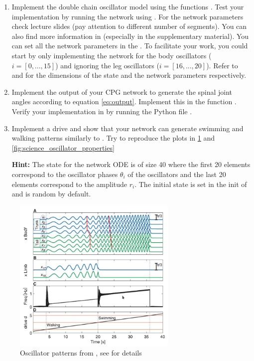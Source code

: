 \documentclass{cmc}
\begin{document}
\begin{enumerate}
\item Implement the double chain oscillator model using the functions
  . Test your implementation by running the
  network using . For the network parameters check
  lecture slides (pay attention to different number of segments). You can also
  find more information in \cite{ijspeert2007swimming} (especially in the
  supplementary material). You can set all the network parameters in the
  . To facilitate your work, you
  could start by only implementing the network for the body oscillators
  ($i=[0, ..., 15]$) and ignoring the leg oscillators ($i=[16, ..., 20]$). Refer
  to  and
  \- for the dimensions of
  the state and the network parameters respectively.

\item Implement the output of your CPG network to generate the spinal joint
  angles according to equation \ref{eq:output}. Implement this in the function
  . Verify your implementation in by running
  the Python file .


\item Implement a drive and show that your network can generate swimming and
  walking patterns similarly to \cite{ijspeert2007swimming}. Try to reproduce
  the plots in \ref{fig:science_oscillator_patterns} and
  \ref{fig:science_oscillator_properties}


  \textbf{Hint:} The state for the network ODE is of size 40 where the first 20
  elements correspond to the oscillator phases $\theta_i$ of the oscillators and
  the last 20 elements correspond to the amplitude $r_i$. The initial state is
  set in the init of  and is random by
  default.
\end{enumerate}

\begin{figure}[H]
  \centering
  \includegraphics[width=0.7\textwidth]{figures/science_oscillator_patterns}
  \caption{Oscillator patterns from \cite{ijspeert2007swimming}, see
    \cite{ijspeert2007swimming} for details}
  \label{fig:science_oscillator_patterns}
\end{figure}
\end{document}
